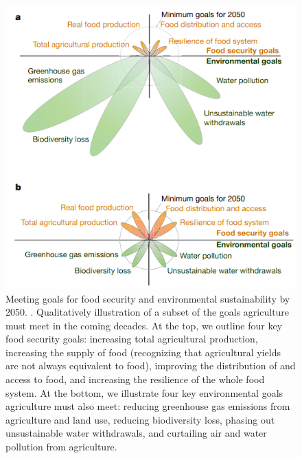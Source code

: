 \begin{figure}[H]
    \centering
    \includegraphics[width=0.8\linewidth]{Images/security.png}
    \caption{Meeting goals for food security and environmental sustainability by 2050. . Qualitatively illustration of a subset of the goals agriculture must meet in the coming decades. At the top, we outline four key food security goals: increasing total agricultural production, increasing the supply of food (recognizing that agricultural yields are not always equivalent to food), improving the distribution of and access to food, and increasing the resilience of the whole food system. At the bottom, we illustrate four key environmental goals agriculture must also meet: reducing greenhouse gas emissions from agriculture and land use, reducing biodiversity loss, phasing out unsustainable water withdrawals, and curtailing air and water pollution from agriculture. \cite{Cardinale2012}}
    \label{fig:security}
\end{figure}

